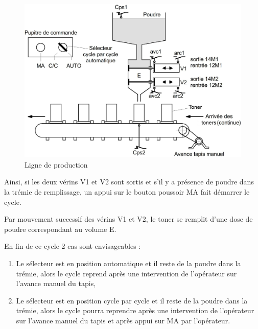 \begin{figure}[htbp]
\begin{center}
\includegraphics[width=.8\linewidth]{img/ligne_auto.jpg}
\caption{Ligne de production}
\label{fig:image7}
\end{center}
\end{figure}

Ainsi, si les deux vérins V1 et V2 sont sortis et s'il y a présence de poudre dans la trémie de remplissage, un appui sur le bouton poussoir MA fait démarrer le cycle.

Par mouvement successif des vérins V1 et V2, le toner se remplit d'une dose de poudre correspondant au volume E.

En fin de ce cycle 2 cas sont envisageables :
\begin{enumerate}
 \item Le sélecteur est en position automatique et il reste de la poudre dans la trémie, alors le cycle reprend après une intervention de l'opérateur sur l'avance manuel du tapis,
 \item Le sélecteur est en position cycle par cycle et il reste de la poudre dans la trémie, alors le cycle pourra reprendre après une intervention de l'opérateur sur l'avance manuel du tapis  et après appui sur MA par l'opérateur.
\end{enumerate}

